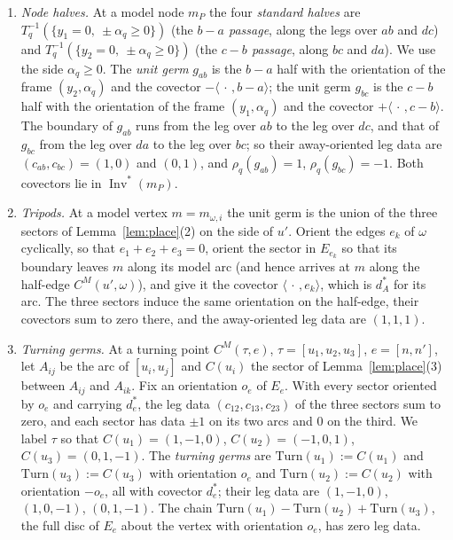 \begin{enumerate}
\item[(M1)] \emph{Node halves.} At a model node $m_P$ the four \emph{standard halves} are
$T_q^{-1}(\{y_1=0,\ \pm\alpha_q\ge0\})$ (the \emph{$b-a$ passage}, along the legs over $ab$ and $dc$) and
$T_q^{-1}(\{y_2=0,\ \pm\alpha_q\ge0\})$ (the \emph{$c-b$ passage}, along $bc$ and $da$). We use the side $\alpha_q\ge0$.
The \emph{unit germ} $g_{ab}$ is the $b-a$ half with the orientation of the frame $(y_2,\alpha_q)$ and the covector
$-\langle\,\cdot\,,b-a\rangle$; the unit germ $g_{bc}$ is the $c-b$ half with the orientation of the frame
$(y_1,\alpha_q)$ and the covector $+\langle\,\cdot\,,c-b\rangle$. The boundary of $g_{ab}$ runs from the leg over $ab$ to the leg over $dc$, and that of
$g_{bc}$ from the leg over $da$ to the leg over $bc$; so their away-oriented leg data are $(c_{ab},c_{bc})=(1,0)$ and
$(0,1)$, and $\rho_q(g_{ab})=1$, $\rho_q(g_{bc})=-1$. Both covectors lie in $\operatorname{Inv}^*(m_P)$.
\item[(M2)] \emph{Tripods.} At a model vertex $m=m_{\omega,i}$ the unit germ is the union of the three sectors of
Lemma~\ref{lem:place}(2) on the side of $u'$. Orient the edges $e_k$ of $\omega$ cyclically, so that $e_1+e_2+e_3=0$, orient
the sector in $E_{e_k}$ so that its boundary leaves $m$ along its model arc (and hence arrives at $m$ along the half-edge
$C^M(u',\omega)$), and give it the covector $\langle\,\cdot\,,e_k\rangle$, which is $d^*_A$ for its arc. The three sectors
induce the same orientation on the half-edge, their covectors sum to zero there, and the away-oriented leg data are
$(1,1,1)$.
\item[(M3)] \emph{Turning germs.} At a turning point $C^M(\tau,e)$, $\tau=[u_1,u_2,u_3]$, $e=[n,n']$, let $A_{ij}$ be the arc
of $[u_i,u_j]$ and $C(u_i)$ the sector of Lemma~\ref{lem:place}(3) between $A_{ij}$ and $A_{ik}$. Fix an orientation $o_e$
of $E_e$. With every sector oriented by $o_e$ and carrying $d^*_e$, the leg data $(c_{12},c_{13},c_{23})$ of the three
sectors sum to zero, and each sector has data $\pm1$ on its two arcs and $0$ on the third. We label $\tau$ so that
$C(u_1)=(1,-1,0)$, $C(u_2)=(-1,0,1)$, $C(u_3)=(0,1,-1)$. The \emph{turning germs} are $\mathrm{Turn}(u_1):=C(u_1)$ and
$\mathrm{Turn}(u_3):=C(u_3)$ with orientation $o_e$ and $\mathrm{Turn}(u_2):=C(u_2)$ with orientation $-o_e$, all with
covector $d^*_e$; their leg data are $(1,-1,0)$, $(1,0,-1)$, $(0,1,-1)$. The chain $\mathrm{Turn}(u_1)-\mathrm{Turn}(u_2)+
\mathrm{Turn}(u_3)$, the full disc of $E_e$ about the vertex with orientation $o_e$, has zero leg data.

\end{enumerate}
